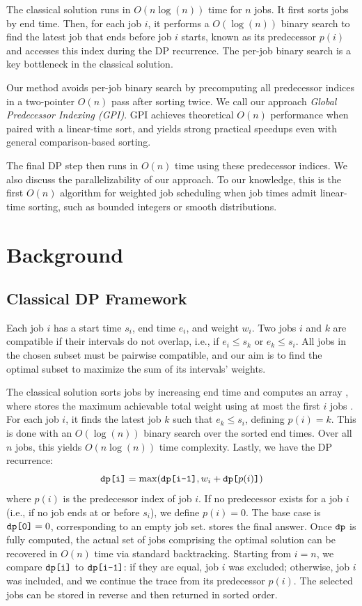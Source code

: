 \documentclass[final,5p,times]{elsarticle}
\newcommand{\code}[1]{\texttt{\detokenize{#1}}}
\begin{document}
The classical solution runs in $O(n \log(n))$ time for $n$ jobs. It first sorts jobs by end time. Then, for each job $i$, it performs a $O(\log(n))$ binary search to find the latest job that ends before job $i$ starts, known as its predecessor $p(i)$ \cite{kleinberg2005} and accesses this index during the DP recurrence. The per-job binary search is a key bottleneck in the classical solution. 

Our method avoids per-job binary search by precomputing all predecessor indices in a two-pointer $O(n)$ pass after sorting twice. We call our approach \emph{Global Predecessor Indexing (GPI)}. GPI achieves theoretical $O(n)$ performance when paired with a linear-time sort, and yields strong practical speedups even with general comparison-based sorting.

The final DP step then runs in $O(n)$ time using these predecessor indices. We also discuss the parallelizability of our approach. To our knowledge, this is the first $O(n)$ algorithm for weighted job scheduling when job times admit linear-time sorting, such as bounded integers or smooth distributions.

\section{Background}
\label{sec:background}

\subsection{Classical DP Framework}

Each job $i$ has a start time $s_i$, end time $e_i$, and weight $w_i$. Two jobs $i$ and $k$ are compatible if their intervals do not overlap, i.e., if $e_i \leq s_k$ or $e_k \leq s_i$. All jobs in the chosen subset must be pairwise compatible, and our aim is to find the optimal subset to maximize the sum of its intervals' weights.

The classical solution sorts jobs by increasing end time and computes an array \code{dp}, where \code{dp[i]} stores the maximum achievable total weight using at most the first $i$ jobs \cite{kleinberg2005}. For each job $i$, it finds the latest job $k$ such that $e_k \leq s_i$, defining $p(i) = k$. This is done with an $O(\log(n))$ binary search over the sorted end times. Over all $n$ jobs, this yields $O(n \log(n))$ time complexity. Lastly, we have the DP recurrence:
\[
\code{dp[i]} = \max(\code{dp[i-1]}, w_i + \code{dp[}p(i)\code{]})
\]
where $p(i)$ is the predecessor index of job $i$. If no predecessor exists for a job $i$ (i.e., if no job ends at or before $s_i$), we define $p(i) = 0$. The base case is $\code{dp[0]}=0$, corresponding to an empty job set. \code{dp[n]} stores the final answer. Once $\code{dp}$ is fully computed, the actual set of jobs comprising the optimal solution can be recovered in $O(n)$ time via standard backtracking. Starting from $i = n$, we compare $\code{dp[i]}$ to $\code{dp[i-1]}$: if they are equal, job $i$ was excluded; otherwise, job $i$ was included, and we continue the trace from its predecessor $p(i)$. The selected jobs can be stored in reverse and then returned in sorted order.
\end{document}
